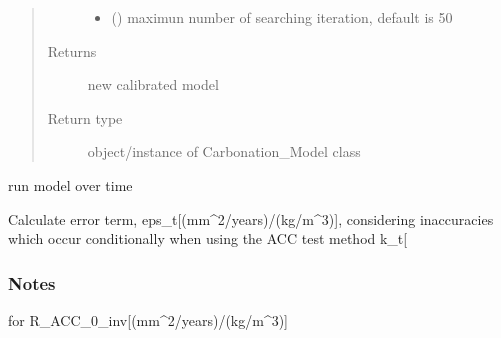\documentclass[letterpaper,10pt,english]{sphinxmanual}
\begin{document}
\begin{fulllineitems}
\begin{quote}
\begin{description}
\begin{itemize}
\item {} 
\sphinxAtStartPar
{} () \textendash{} maximun number of searching iteration, default is 50

\end{itemize}

\item[{Returns}] \leavevmode
\sphinxAtStartPar
{} \textendash{} new calibrated model

\item[{Return type}] \leavevmode
\sphinxAtStartPar
object/instance of Carbonation\_Model class

\end{description}\end{quote}

\end{fulllineitems}


\begin{fulllineitems}
\label{\detokenize{carbonation:carbonation.carb_year}}
\sphinxAtStartPar
run model over time

\end{fulllineitems}


\begin{fulllineitems}
\label{\detokenize{carbonation:carbonation.eps_t}}
\sphinxAtStartPar
Calculate error term, eps\_t{[}(mm\textasciicircum{}2/years)/(kg/m\textasciicircum{}3){]},
considering inaccuracies which occur conditionally when using the ACC test method  k\_t{[}\sphinxhyphen{}{]}
\subsubsection*{Notes}

\sphinxAtStartPar
for R\_ACC\_0\_inv{[}(mm\textasciicircum{}2/years)/(kg/m\textasciicircum{}3){]}

\end{fulllineitems}
\end{document}

